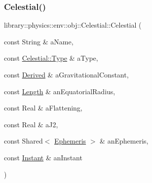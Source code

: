 \subsubsection{\texorpdfstring{Celestial()}{Celestial()}\hspace{0.1cm}{\footnotesize\ttfamily [1/2]}}
{\footnotesize\ttfamily library\+::physics\+::env\+::obj\+::\+Celestial\+::\+Celestial (\begin{DoxyParamCaption}\item[{const String \&}]{a\+Name,  }\item[{const \hyperlink{classlibrary_1_1physics_1_1env_1_1obj_1_1_celestial_aab1f58aa727e639288d65f3d33c4f245}{Celestial\+::\+Type} \&}]{a\+Type,  }\item[{const \hyperlink{classlibrary_1_1physics_1_1units_1_1_derived}{Derived} \&}]{a\+Gravitational\+Constant,  }\item[{const \hyperlink{classlibrary_1_1physics_1_1units_1_1_length}{Length} \&}]{an\+Equatorial\+Radius,  }\item[{const Real \&}]{a\+Flattening,  }\item[{const Real \&}]{a\+J2,  }\item[{const Shared$<$ \hyperlink{classlibrary_1_1physics_1_1env_1_1_ephemeris}{Ephemeris} $>$ \&}]{an\+Ephemeris,  }\item[{const \hyperlink{classlibrary_1_1physics_1_1time_1_1_instant}{Instant} \&}]{an\+Instant }\end{DoxyParamCaption})}

\mbox{\label{classlibrary_1_1physics_1_1env_1_1obj_1_1_celestial_a7ee6c55653113c71bf79d8c0d64878d7}} 
